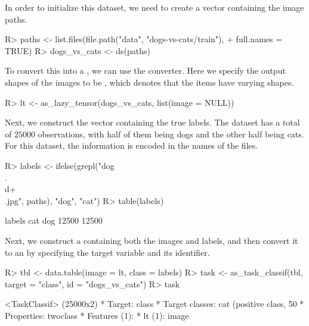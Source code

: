 \documentclass[article]{jss}
\theoremstyle{definition}
\begin{document}

In order to initialize this dataset, we need to create a vector containing the image paths.

\begin{CodeInput}
R> paths <- list.files(file.path("data", "dogs-vs-cats/train"),
+    full.names = TRUE)
R> dogs_vs_cats <- ds(paths)
\end{CodeInput}

To convert this into a , we can use the  converter.
Here we specify the output shapes of the images to be , which denotes that the items have varying shapes.

\begin{CodeInput}
R> lt <- as_lazy_tensor(dogs_vs_cats, list(image = NULL))
\end{CodeInput}

Next, we construct the vector containing the true labels.
The dataset has a total of $25000$ observations, with half of them being dogs and the other half being cats.
For this dataset, the information is encoded in the names of the files.

\begin{CodeInput}
R> labels <- ifelse(grepl("dog\\.\\d+\\.jpg", paths), "dog", "cat")
R> table(labels)
\end{CodeInput}
\begin{CodeOutput}
labels
  cat   dog
12500 12500
\end{CodeOutput}

Next, we construct a  \citep{ref-datatable2024} containing both the images and labels, and then convert it to an  by specifying the target variable and its identifier.

\begin{CodeInput}
R> tbl <- data.table(image = lt, class = labels)
R> task <- as_task_classif(tbl, target = "class", id = "dogs_vs_cats")
R> task
\end{CodeInput}
\begin{CodeOutput}
<TaskClassif> (25000x2)
* Target: class
* Target classes: cat (positive class, 50%
* Properties: twoclass
* Features (1):
  * lt (1): image
\end{CodeOutput}
\end{document}
